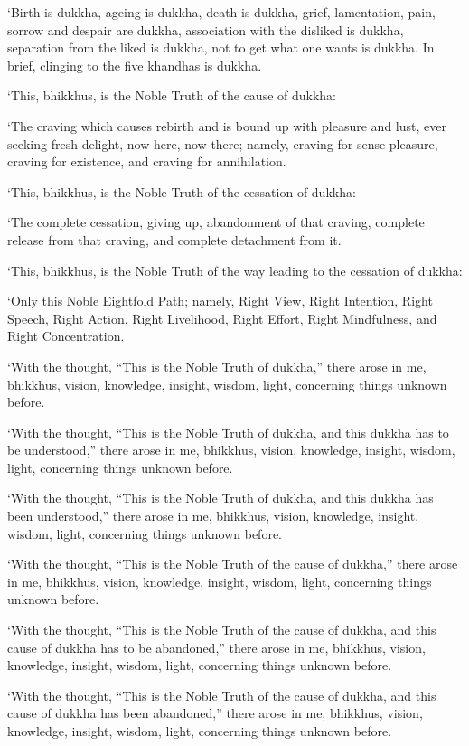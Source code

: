 ‘Birth is dukkha, ageing is dukkha, death is dukkha, grief,
lamentation, pain, sorrow and despair are dukkha, association with the
disliked is dukkha, separation from the liked is dukkha, not to get what
one wants is dukkha. In brief, clinging to the five khandhas is dukkha.

‘This, bhikkhus, is the Noble Truth of the cause of dukkha:

‘The craving which causes rebirth and is bound up with pleasure and
lust, ever seeking fresh delight, now here, now there; namely, craving
for sense pleasure, craving for existence, and craving for annihilation.

‘This, bhikkhus, is the Noble Truth of the cessation of dukkha:

‘The complete cessation, giving up, abandonment of that craving,
complete release from that craving, and complete detachment from it.

‘This, bhikkhus, is the Noble Truth of the way leading to the cessation
of dukkha:

‘Only this Noble Eightfold Path; namely, Right View, Right Intention,
Right Speech, Right Action, Right Livelihood, Right Effort, Right
Mindfulness, and Right Concentration.

‘With the thought, “This is the Noble Truth of dukkha,” there arose in
me, bhikkhus, vision, knowledge, insight, wisdom, light, concerning
things unknown before.

‘With the thought, “This is the Noble Truth of dukkha, and this dukkha
has to be understood,” there arose in me, bhikkhus, vision, knowledge,
insight, wisdom, light, concerning things unknown before.

‘With the thought, “This is the Noble Truth of dukkha, and this dukkha
has been understood,” there arose in me, bhikkhus, vision, knowledge,
insight, wisdom, light, concerning things unknown before.

‘With the thought, “This is the Noble Truth of the cause of dukkha,”
there arose in me, bhikkhus, vision, knowledge, insight, wisdom, light,
concerning things unknown before.

‘With the thought, “This is the Noble Truth of the cause of dukkha, and
this cause of dukkha has to be abandoned,” there arose in me, bhikkhus,
vision, knowledge, insight, wisdom, light, concerning things unknown
before.

‘With the thought, “This is the Noble Truth of the cause of dukkha, and
this cause of dukkha has been abandoned,” there arose in me, bhikkhus,
vision, knowledge, insight, wisdom, light, concerning things unknown
before.

